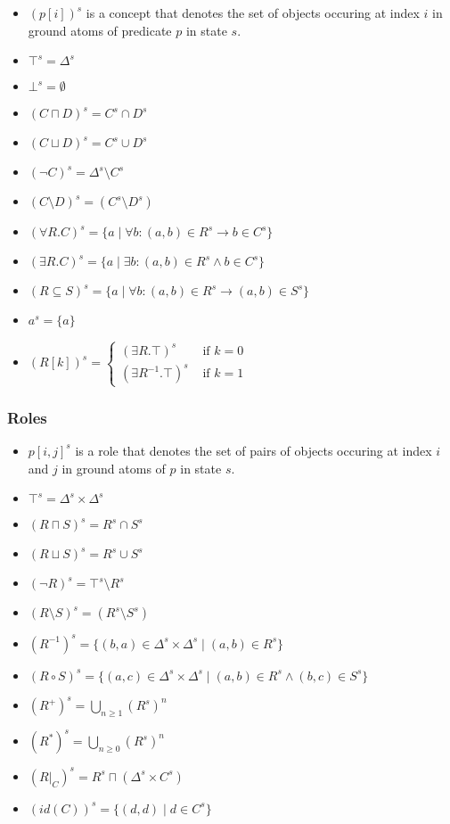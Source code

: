 \documentclass{article}
\begin{document}
\begin{itemize}
    \item $(p[i])^s$ is a concept that denotes the set of
    objects occuring at index $i$ in ground atoms of predicate $p$ in state $s$.
    \item $\top^s = \Delta^s$
    \item $\bot^s = \emptyset$
    \item $(C\sqcap D)^s = C^s\cap D^s$
    \item $(C\sqcup D)^s = C^s\cup D^s$
    \item $(\neg C)^s = \Delta^s\setminus C^s$
    \item $(C\setminus D)^s = (C^s\setminus D^s)$
    \item $(\forall R.C)^s = \{a\mid\forall b:(a,b)\in R^s\rightarrow b\in C^s\}$
    \item $(\exists R.C)^s = \{a\mid\exists b:(a,b)\in R^s\land b\in C^s\}$
    \item $(R\subseteq S)^s = \{a\mid\forall b:(a,b)\in R^s\rightarrow (a,b)\in S^s\}$
    \item $a^s = \{a\}$
    \item $(R[k])^s = \begin{cases}(\exists R.\top)^s & \text{ if } k = 0\\ (\exists R^{-1}.\top)^s & \text{ if } k = 1 \end{cases}$
\end{itemize}

\subsubsection{Roles}

\begin{itemize}
    \item $p[i,j]^s$ is a role that denotes the set of pairs of
    objects occuring at index $i$ and $j$ in ground atoms of $p$ in state $s$.
    \item $\top^s = \Delta^s\times\Delta^s$
    \item $(R\sqcap S)^s = R^s\cap S^s$
    \item $(R\sqcup S)^s = R^s\cup S^s$
    \item $(\neg R)^s = \top^s\setminus R^s$
    \item $(R\setminus S)^s = (R^s\setminus S^s)$
    \item $(R^{-1})^s = \{(b,a)\in\Delta^s\times\Delta^s\mid (a,b)\in R^s\}$
    \item $(R\circ S)^s = \{(a,c)\in\Delta^s\times\Delta^s\mid (a,b)\in R^s\land (b,c)\in S^s \}$
    \item $(R^+)^s = \bigcup_{n\geq 1}(R^s)^n$
    \item $(R^*)^s = \bigcup_{n\geq 0}(R^s)^n$
    \item $(R\vert_{C})^s = R^s\sqcap (\Delta^s\times C^s)$
    \item $(\mathit{id}(C))^s = \{(d,d)\mid d\in C^s \}$
\end{itemize}
\end{document}
